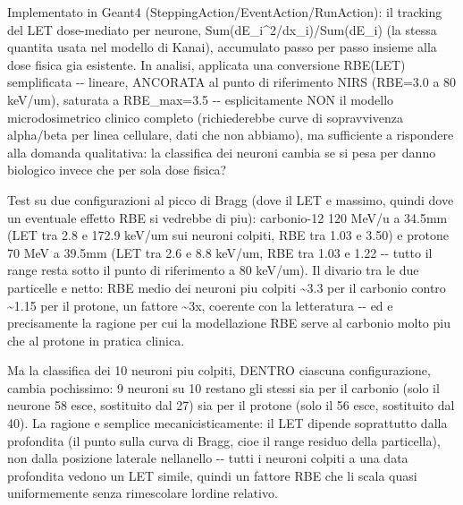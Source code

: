 \documentclass[
  italian,
]{article}
\begin{document}
Implementato in Geant4 (SteppingAction/EventAction/RunAction): il tracking del LET dose-mediato per neurone, Sum(dE\_\allowbreak{}i\^{}2/dx\_\allowbreak{}i)/Sum(dE\_\allowbreak{}i) (la stessa quantita\textquotesingle{} usata nel modello di Kanai), accumulato passo per passo insieme alla dose fisica gia\textquotesingle{} esistente. In analisi, applicata una conversione RBE(LET) semplificata -\/- lineare, ANCORATA al punto di riferimento NIRS (RBE=3.0 a 80 keV/um), saturata a RBE\_\allowbreak{}max=3.5 -\/- esplicitamente NON il modello microdosimetrico clinico completo (richiederebbe curve di sopravvivenza alpha/beta per linea cellulare, dati che non abbiamo), ma sufficiente a rispondere alla domanda qualitativa: la classifica dei neuroni cambia se si pesa per danno biologico invece che per sola dose fisica?

Test su due configurazioni al picco di Bragg (dove il LET e\textquotesingle{} massimo, quindi dove un eventuale effetto RBE si vedrebbe di piu\textquotesingle): carbonio-12 120 MeV/u a 34.5mm (LET tra 2.8 e 172.9 keV/um sui neuroni colpiti, RBE tra 1.03 e 3.50) e protone 70 MeV a 39.5mm (LET tra 2.6 e 8.8 keV/um, RBE tra 1.03 e 1.22 -\/- tutto il range resta sotto il punto di riferimento a 80 keV/um). Il divario tra le due particelle e\textquotesingle{} netto: RBE medio dei neuroni piu\textquotesingle{} colpiti \textasciitilde3.3 per il carbonio contro \textasciitilde1.15 per il protone, un fattore \textasciitilde3x, coerente con la letteratura -\/- ed e\textquotesingle{} precisamente la ragione per cui la modellazione RBE serve al carbonio molto piu\textquotesingle{} che al protone in pratica clinica.

Ma la classifica dei 10 neuroni piu\textquotesingle{} colpiti, DENTRO ciascuna configurazione, cambia pochissimo: 9 neuroni su 10 restano gli stessi sia per il carbonio (solo il neurone 58 esce, sostituito dal 27) sia per il protone (solo il 56 esce, sostituito dal 40). La ragione e\textquotesingle{} semplice mecanicisticamente: il LET dipende soprattutto dalla profondita\textquotesingle{} (il punto sulla curva di Bragg, cioe\textquotesingle{} il range residuo della particella), non dalla posizione laterale nell\textquotesingle anello -\/- tutti i neuroni colpiti a una data profondita\textquotesingle{} vedono un LET simile, quindi un fattore RBE che li scala quasi uniformemente senza rimescolare l\textquotesingle ordine relativo.
\end{document}
